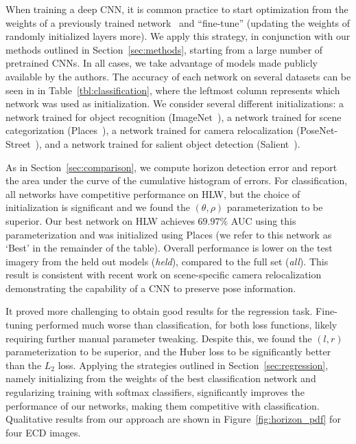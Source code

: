 \documentclass{bmvc2k}
\newcommand{\secref}[1]{Section~\ref{sec:#1}}
\newcommand{\figref}[1]{Figure~\ref{fig:#1}}
\newcommand{\tblref}[1]{Table~\ref{tbl:#1}}
\begin{document}
When training a deep CNN, it is common practice to start optimization
from the weights of a previously trained
network~\cite{yosinski2014transferable} and ``fine-tune'' (updating
the weights of randomly initialized layers more). We apply this
strategy, in conjunction with our methods outlined in \secref{methods},
starting from a large number of pretrained CNNs. In all cases, we take
advantage of models made publicly available by the authors.  The
accuracy of each network on several datasets can be seen in in
\tblref{classification}, where the leftmost column represents which
network was used as initialization. We consider several different
initializations: a network trained for object recognition
(ImageNet~\cite{jia2014caffe}), a network trained for scene
categorization (Places~\cite{zhou2014places}), a network trained for
camera relocalization
(PoseNet-Street~\cite{kendall2015convolutional}), and a network
trained for salient object detection
(Salient~\cite{zhang2016unconstrained}).

As in \secref{comparison}, we compute horizon detection error and
report the area under the curve of the cumulative histogram of errors.
For classification, all networks have competitive performance on HLW,
but the choice of initialization is significant and we found the
$(\theta, \rho)$ parameterization to be superior. Our best network on HLW
achieves $69.97\%$ AUC using this parameterization and was initialized
using Places (we refer to this network as `Best' in the remainder of the
table). Overall performance is lower on the test imagery from the held
out models ({\em held}), compared to the full set ({\em all}). This result is
consistent with recent work on scene-specific camera
relocalization~\cite{kendall2015convolutional} demonstrating the
capability of a CNN to preserve pose information.

It proved more challenging to obtain good results for the regression
task. Fine-tuning performed much
worse than classification, for both loss functions, likely requiring
further manual parameter tweaking. Despite this, we found the $(l, r)$
parameterization to be superior, and the Huber loss to be
significantly better than the $L_2$ loss. Applying the strategies
outlined in \secref{regression}, namely initializing from the weights
of the best classification network and regularizing training with
softmax classifiers, significantly improves the performance of our
networks, making them competitive with classification. Qualitative
results from our approach are shown in \figref{horizon_pdf} for four
ECD images. 
\end{document}
